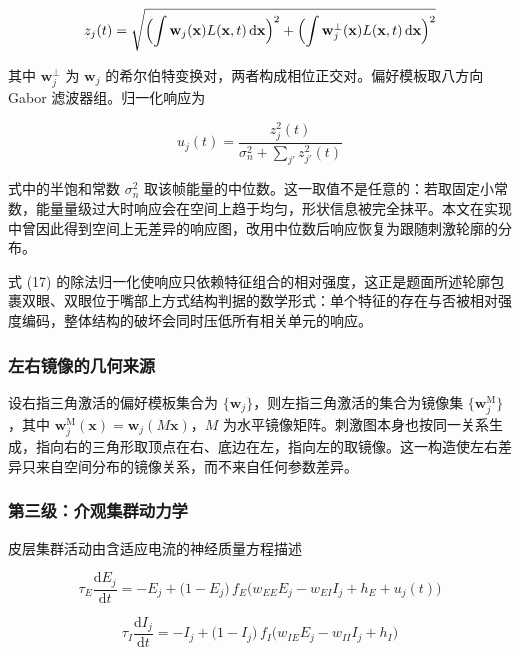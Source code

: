 \documentclass[bwprint]{gmcmthesis}
\begin{document}
\begin{equation}
z_j(t) = \sqrt{\Bigl(\int \mathbf{w}_j(\mathbf{x})L(\mathbf{x},t)\,\mathrm{d}\mathbf{x}\Bigr)^{2} + \Bigl(\int \mathbf{w}_j^{\perp}(\mathbf{x})L(\mathbf{x},t)\,\mathrm{d}\mathbf{x}\Bigr)^{2}}
\end{equation}

其中 $\mathbf{w}_j^{\perp}$ 为 $\mathbf{w}_j$ 的希尔伯特变换对，两者构成相位正交对。偏好模板取八方向 Gabor 滤波器组。归一化响应为

\begin{equation}
u_j(t) = \frac{z_j^{2}(t)}{\sigma_n^{2} + \sum_{j'} z_{j'}^{2}(t)}
\end{equation}

式中的半饱和常数 $\sigma_n^{2}$ 取该帧能量的中位数。这一取值不是任意的：若取固定小常数，能量量级过大时响应会在空间上趋于均匀，形状信息被完全抹平。本文在实现中曾因此得到空间上无差异的响应图，改用中位数后响应恢复为跟随刺激轮廓的分布。

式 (17) 的除法归一化使响应只依赖特征组合的相对强度，这正是题面所述轮廓包裹双眼、双眼位于嘴部上方式结构判据的数学形式：单个特征的存在与否被相对强度编码，整体结构的破坏会同时压低所有相关单元的响应。

\subsubsection{左右镜像的几何来源}

设右指三角激活的偏好模板集合为 $\{\mathbf{w}_j\}$，则左指三角激活的集合为镜像集 $\{\mathbf{w}_j^{\mathrm{M}}\}$，其中 $\mathbf{w}_j^{\mathrm{M}}(\mathbf{x}) = \mathbf{w}_j(M\mathbf{x})$，$M$ 为水平镜像矩阵。刺激图本身也按同一关系生成，指向右的三角形取顶点在右、底边在左，指向左的取镜像。这一构造使左右差异只来自空间分布的镜像关系，而不来自任何参数差异。

\subsubsection{第三级：介观集群动力学}

皮层集群活动由含适应电流的神经质量方程描述

\begin{equation}
\tau_E\frac{\mathrm{d}E_j}{\mathrm{d}t} = -E_j + \bigl(1-E_j\bigr)\,f_E\bigl(w_{EE}E_j - w_{EI}I_j + h_E + u_j(t)\bigr)
\end{equation}

\begin{equation}
\tau_I\frac{\mathrm{d}I_j}{\mathrm{d}t} = -I_j + \bigl(1-I_j\bigr)\,f_I\bigl(w_{IE}E_j - w_{II}I_j + h_I\bigr)
\end{equation}
\end{document}
